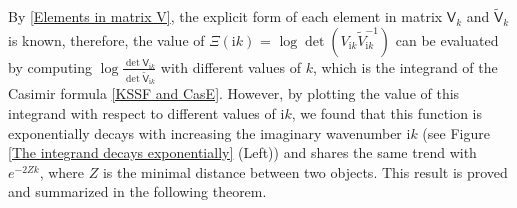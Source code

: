 By \eqref{Elements in matrix V}, the explicit form of each element in matrix $\mathsf{V}_{k}$ and $\tilde{\mathsf{V}}_{k}$ is known, therefore,
the value of $\Xi(\mathrm{i}k)$ = $\log\det(V_{\mathrm{i}k}\tilde{V}_{\mathrm{i}k}^{-1})$ can be evaluated by computing 
$\log\frac{\det\mathsf{V}_{\mathrm{i}k}}{\det\tilde{\mathsf{V}}_{\mathrm{i}k}}$ with 
different values of $k$, which is the integrand of the Casimir formula \eqref{KSSF and CasE}. However, by plotting the value of this integrand 
with respect to different values of $\mathrm{i}k$, we found that this function is exponentially decays with increasing the imaginary wavenumber 
$\mathrm{i}k$ (see Figure \ref{The integrand decays exponentially} (Left)) and shares the same trend with $e^{-2Zk}$,  where $Z$ is the minimal distance 
between two objects. This result is proved and summarized in the following theorem. 


